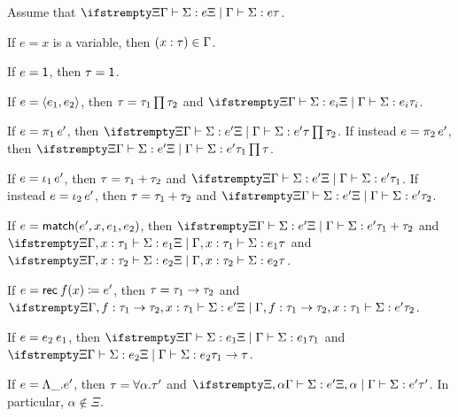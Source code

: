 \begin{lemma}
    \label{lem:inversion-typing}
    Assume that $\typerel{\Xi}{\Gamma}{\Sigma}{e}{\tau}$.
    \begin{enumlemma}[left=0.5cm] %
        \item\label{enum:inversion-variable} If $e = x$ is a variable, then $\hastype*{x}{\tau} \in \Gamma$.
        
        \item\label{enum:inversion-unit} If $e = \mathsf{1}$, then $\tau = \mathsf{1}$.

        \item\label{enum:inversion-pair} If $e = \langle\textcolor{black}{e_1},\textcolor{black}{e_2}\rangle$, then $\tau = \typeProd{\tau_1}{\tau_2}$ and $\typerel{\Xi}{\Gamma}{\Sigma}{e_i}{\tau_i}$.

        \item\label{enum:inversion-proj} If $e = \expProjl{e'}$, then $\typerel{\Xi}{\Gamma}{\Sigma}{e'}{\tau \prod \tau_2}$. If instead $e = \expProjr{e'}$, then $\typerel{\Xi}{\Gamma}{\Sigma}{e'}{\tau_1 \prod \tau}$.
        
        \item\label{enum:inversion-inj} If $e = \expInjl{e'}$, then $\tau = \textcolor{black}{\tau_1} + \textcolor{black}{\tau_2}$ and $\typerel{\Xi}{\Gamma}{\Sigma}{e'}{\tau_1}$. If instead $e = \expInjr{e'}$, then $\tau = \textcolor{black}{\tau_1} + \textcolor{black}{\tau_2}$ and $\typerel{\Xi}{\Gamma}{\Sigma}{e'}{\tau_2}$.

        \item\label{enum:inversion-match} If $e = \mathsf{match}(e',x,e_1,e_2)$, then $\typerel{\Xi}{\Gamma}{\Sigma}{e'}{\typeSum{\tau_1}{\tau_2}}$ and $\typerel{\Xi}{\Gamma, \hastype{x}{\tau_1}}{\Sigma}{e_1}{\tau}$ and $\typerel{\Xi}{\Gamma, \hastype{x}{\tau_2}}{\Sigma}{e_2}{\tau}$.

        \item\label{enum:inversion-rec} If $e = \expRec{f}{x}{e'}$, then $\tau = \typeFunc{\tau_1}{\tau_2}$ and $\typerel{\Xi}{\Gamma, \hastype{f}{\typeFunc{\tau_1}{\tau_2}}, \hastype{x}{\tau_1}}{\Sigma}{e'}{\tau_2}$.

        \item\label{enum:inversion-app} If $e = \expApp{e_2}{e_1}$, then $\typerel{\Xi}{\Gamma}{\Sigma}{e_1}{\tau_1}$ and $\typerel{\Xi}{\Gamma}{\Sigma}{e_2}{\typeFunc{\tau_1}{\tau}}$.

        \item\label{enum:inversion-forall} If $e = \expForall{\alpha}{e'}$, then $\tau = \typeForall{\alpha}{\tau'}$ and $\typerel{\Xi,\alpha}{\Gamma}{\Sigma}{e'}{\tau'}$. In particular, $\alpha \not\in \Xi$.
        

\end{enumlemma}
\end{lemma}

